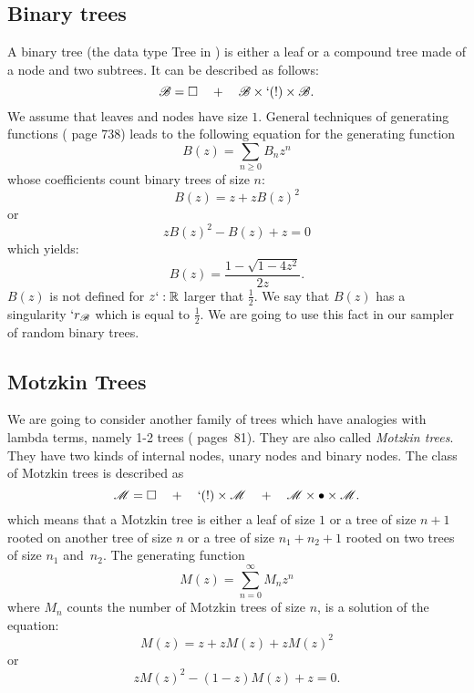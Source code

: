 \documentclass{sig-alternate}
\newcommand{\Bt}{\mathscr{B}}
\newcommand{\M}{\mathscr{M}}
\newcommand{\real}{\ensuremath{\mathbb{R}}}
\begin{document}
\subsection{Binary trees}
\label{sec:BinTrees}

A binary tree (the data type \textsf{Tree} in \cite{DBLP:conf/icfp/ClaessenH00})
is either a leaf or a compound tree made of a node and two subtrees. It can be
described as follows:
\[\Bt = \Box \quad + \quad \Bt \times `(!) \times \Bt.\]
We assume that leaves and nodes have size $1$.  General techniques of generating
functions (\cite{flajolet08:_analy_combin} page 738) leads to the following equation
for the generating function \[B(z) = \sum_{n\ge 0} B_n z^n\] whose coefficients count
binary trees of size $n$:
\[B(z) = z + z B(z)^2\] or
\begin{displaymath}
  z B(z)^2 - B(z) + z = 0
\end{displaymath}
which yields:
\[B(z) = \frac{1 - \sqrt{1-4z^2}}{2z}.\] $B(z)$ is not defined for $z`:\real$ larger
that $\frac{1}{2}$. We say that $B(z)$ has a singularity $`r_\Bt$ which is equal to
$\frac{1}{2}$.  We are going to use this fact in our sampler of random binary trees.

\subsection{Motzkin Trees}
\label{sec:MotzTrees}

We are going to consider another family of trees which have analogies with lambda
terms, namely 1-2 trees (\cite{flajolet08:_analy_combin} pages~81). They are also
called \emph{Motzkin trees}. They have two kinds of internal nodes, unary nodes and
binary nodes.  The class of Motzkin trees is described as
\begin{displaymath}
  \M = \Box \quad + \quad `(!) \times \M \quad + \quad \M \times \bullet \times \M.
\end{displaymath}
which means that a Motzkin tree is either a leaf of size $1$ or a tree of size $n+1$
rooted on another tree of size $n$ or a tree of size $n_1 + n_2 +1$ rooted on two
trees of size $n_1$ and~$n_2$.  The generating function 
\begin{displaymath}
  M(z) = \sum_{n=0}^\infty M_n z^n
\end{displaymath}
where $M_n$ counts the number of Motzkin trees of size $n$, is a solution of the
equation:
\begin{displaymath}
  M(z) = z + z M(z) + z M(z)^2
\end{displaymath}
or
\begin{displaymath}
  z M(z)^2 - (1-z)M(z) + z = 0.
\end{displaymath}
\end{document}
